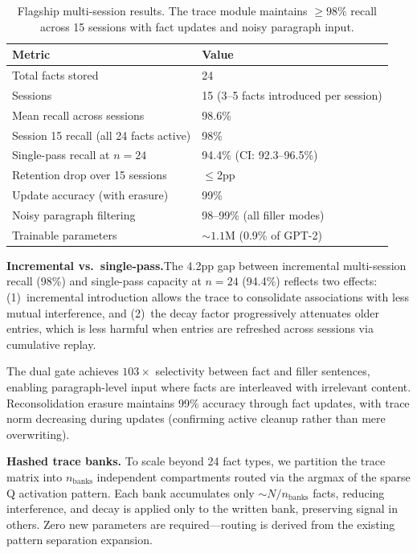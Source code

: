 \documentclass[11pt,a4paper]{article}
\begin{document}
\begin{table}[t]
  \centering
  \caption{Flagship multi-session results. The trace module maintains ${\geq}98\%$ recall across 15 sessions with fact updates and noisy paragraph input.}
  \label{tab:flagship}
  \begin{tabular}{@{}ll@{}}
    \toprule
    Metric & Value \\
    \midrule
    Total facts stored & 24 \\
    Sessions & 15 (3--5 facts introduced per session) \\
    Mean recall across sessions & 98.6\% \\
    Session 15 recall (all 24 facts active) & 98\% \\
    Single-pass recall at $n{=}24$ & 94.4\% (CI: 92.3--96.5\%) \\
    Retention drop over 15 sessions & $\leq$2pp \\
    Update accuracy (with erasure) & 99\% \\
    Noisy paragraph filtering & 98--99\% (all filler modes) \\
    Trainable parameters & ${\sim}1.1$M (0.9\% of GPT-2) \\
    \bottomrule
  \end{tabular}
\end{table}

\textbf{Incremental vs.\ single-pass.}\quad The 4.2pp gap between incremental multi-session recall (98\%) and single-pass capacity at $n{=}24$ (94.4\%) reflects two effects: (1)~incremental introduction allows the trace to consolidate associations with less mutual interference, and (2)~the decay factor progressively attenuates older entries, which is less harmful when entries are refreshed across sessions via cumulative replay.

The dual gate achieves $103\times$ selectivity between fact and filler sentences, enabling paragraph-level input where facts are interleaved with irrelevant content. Reconsolidation erasure maintains 99\% accuracy through fact updates, with trace norm decreasing during updates (confirming active cleanup rather than mere overwriting).

\textbf{Hashed trace banks.}\quad
\label{sec:banks}
To scale beyond 24 fact types, we partition the trace matrix into $n_{\text{banks}}$ independent compartments routed via the argmax of the sparse Q activation pattern. Each bank accumulates only ${\sim}N/n_{\text{banks}}$ facts, reducing interference, and decay is applied only to the written bank, preserving signal in others. Zero new parameters are required---routing is derived from the existing pattern separation expansion.
\end{document}
